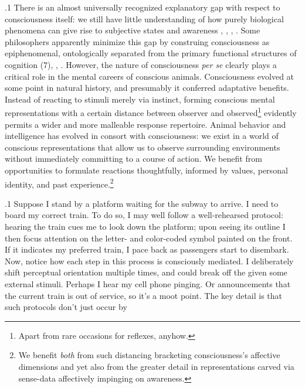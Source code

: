 \documentclass[11pt, twocolumn]{article}
\begin{document}
\p.1{%
\:\+There is an almost universally recognized explanatory gap with respect
to consciousness itself: we still have little understanding of
how purely biological phenomena can give rise to subjective
 states and awareness , ,
, . \>  Some philosophers
apparently minimize this gap by construing consciousness as epiphenomenal,
ontologically \pgl{}separated from the primary functional structures
of cognition (7), ,
. \>  However, the
nature of consciousness \textit{per se} clearly
plays a critical role in the mental careers of conscious animals. \> 
Consciousness evolved at some point in natural history, and presumably
it conferred adaptative benefits. \>  Instead of reacting to stimuli
merely via instinct, forming conscious mental representations
\mdash{} with a certain distance between observer and
observed\footnote{Apart from rare occasions for
 reflexes, anyhow.} \mdash{}
evidently permits a wider and more malleable response
repertoire. \>  Animal behavior and intelligence
has evolved in consort with consciousness: we exist in a world
of conscious representations that allow us to observe
surrounding environments without immediately committing to a
course of action. \>  We benefit
from opportunities to formulate reactions thoughtfully, informed
by values, personal identity, and past experience.\footnote{We benefit
\textit{both} from \label{fn:benefit}such
distancing \mdash{} bracketing consciousness's affective
dimensions \mdash{} and yet also from the greater detail in
representations carved via sense-data affectively
impinging on awareness.}\condenlargepage{1em}\;
}%

\p.1{%
\:\+Suppose I stand by a platform waiting for the subway to arrive. \>  I need to board
my correct train. \>  To do so, I may well follow a well-rehearsed
protocol: hearing the train cues me to look down the platform; upon seeing
its outline I then focus attention on the letter- and color-coded
symbol painted on the front. \>  If it indicates my preferred train,
I pace back as passengers start to disembark. \>  Now,
notice how each step in this process is consciously mediated. \> 
I deliberately shift perceptual orientation multiple
times, and could break off the  given some external
stimuli. \>  Perhaps I hear my cell phone pinging. \>  Or announcements
that the current train is out of service, so it's a moot point. \>  The key
detail is that such protocols don't just occur by
}%
\end{document}
